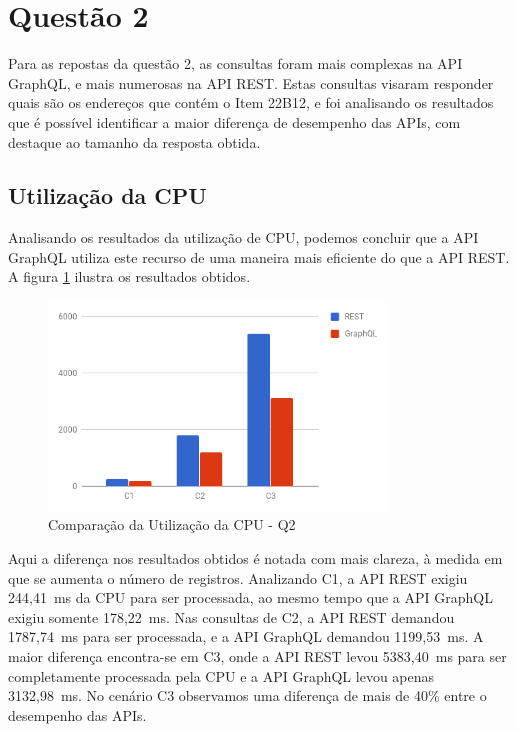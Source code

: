
\section{Questão 2}

Para as repostas da questão 2, as consultas foram mais complexas na API GraphQL, e mais numerosas na API REST. Estas consultas visaram responder quais são os endereços que contém o Item 22B12, e foi analisando os resultados que é possível identificar a maior diferença de desempenho das APIs, com destaque ao tamanho da resposta obtida.

\subsection{Utilização da CPU}

Analisando os resultados da utilização de CPU, podemos concluir que a API GraphQL utiliza este recurso de uma maneira mais eficiente do que a API REST. A figura \ref{fig:q2-cpu} ilustra os resultados obtidos.

\begin{figure}[htbp]
    \centering
    \includegraphics[width=0.8\textwidth]{figuras/q2-cpu.png}
    \caption{Comparação da Utilização da CPU - Q2}
    \label{fig:q2-cpu}
    \author{fonte: Autor}
\end{figure}

Aqui a diferença nos resultados obtidos é notada com mais clareza, à medida em que se aumenta o número de registros. Analizando C1, a API REST exigiu 244,41~ms da CPU para ser processada, ao mesmo tempo que a API GraphQL exigiu somente 178,22~ms. Nas consultas de C2, a API REST demandou 1787,74~ms para ser processada, e a API GraphQL demandou 1199,53~ms. A maior diferença encontra-se em C3, onde a API REST levou 5383,40~ms para ser completamente processada pela CPU e a API GraphQL levou apenas 3132,98~ms. No cenário C3 observamos uma diferença de mais de 40\% entre o desempenho das APIs.

